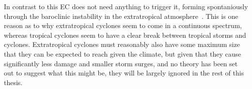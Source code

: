 In contrast to this EC does not need anything to trigger it, forming
spontaniously through the baroclinic instability in the extratropical atmosphere~\cite{lorenz1960energy}.
This is one reason as to why extratropical cyclones seem to come in a continuous spectrum,
whereas tropical cyclones seem to have a clear break between tropical storms and cyclones.
Extratropical cyclones must reasonably also have some maximum size that they can be
expected to reach given the climate, but given that they cause significantly less damage
and smaller storm surges, and no theory has been set out to suggest what this might be,
they will be largely ignored in the rest of this thesis.





